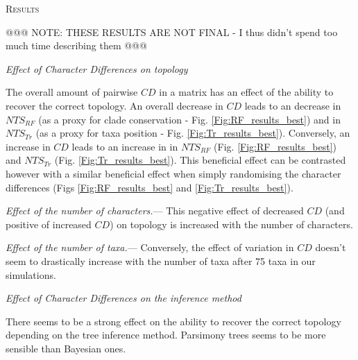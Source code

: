 \documentclass[12pt,letterpaper]{article}
\renewcommand{\section}[1]{%
\bigskip
\begin{center}
\begin{Large}
\normalfont\scshape #1
\medskip
\end{Large}
\end{center}}
\renewcommand{\subsection}[1]{%
\bigskip
\begin{center}
\begin{large}
\normalfont\itshape #1
\end{large}
\end{center}}
\renewcommand{\subsubsection}[1]{%
\vspace{2ex}
\noindent
\textit{#1.}---}
\begin{document}
\section{Results}

@@@ NOTE: THESE RESULTS ARE NOT FINAL - I thus didn't spend too much time describing them @@@

\subsection{Effect of Character Differences on topology}
The overall amount of pairwise $CD$ in a matrix has an effect of the ability to recover the correct topology.
An overall decrease in $CD$ leads to an decrease in $NTS_{RF}$ (as a proxy for clade conservation - Fig. \ref{Fig:RF_results_best}) and in $NTS_{Tr}$ (as a proxy for taxa position - Fig. \ref{Fig:Tr_results_best}).
Conversely, an increase in $CD$ leads to an increase in in $NTS_{RF}$ (Fig. \ref{Fig:RF_results_best}) and $NTS_{Tr}$ (Fig. \ref{Fig:Tr_results_best}).
This beneficial effect can be contrasted however with a similar beneficial effect when simply randomising the character differences (Figs \ref{Fig:RF_results_best} and \ref{Fig:Tr_results_best}).

\subsubsection{Effect of the number of characters}
This negative effect of decreased $CD$ (and positive of increased $CD$) on topology is increased with the number of characters.

\subsubsection{Effect of the number of taxa}
Conversely, the effect of variation in $CD$ doesn't seem to drastically increase with the number of taxa after 75 taxa in our simulations.

\subsection{Effect of Character Differences on the inference method}
There seems to be a strong effect on the ability to recover the correct topology depending on the tree inference method.
Parsimony trees seems to be more sensible than Bayesian ones.
\end{document}
